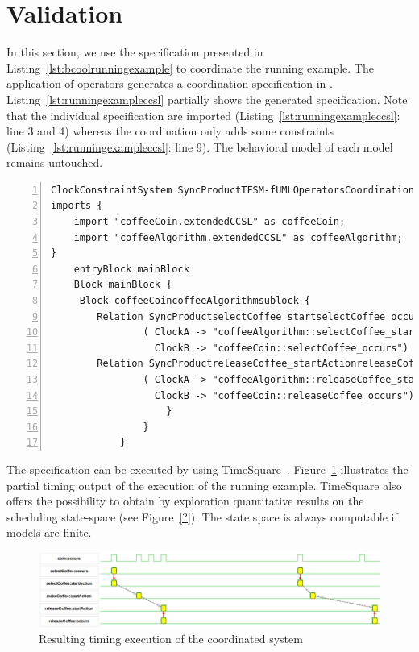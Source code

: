 \section{Validation}
\label{sec:validation}

In this section, we use the \bcool specification presented in Listing~\ref{lst:bcoolrunningexample} to coordinate the running example. The application of \bcool operators generates a coordination specification in \ccsl. Listing~\ref{lst:runningexampleccsl} partially shows the generated \ccsl specification. Note that the individual specification are imported (Listing~\ref{lst:runningexampleccsl}: line 3 and 4) whereas the coordination only adds some constraints (Listing~\ref{lst:runningexampleccsl}: line 9). The behavioral model of each model remains untouched. 
	
\begin{lstlisting}[language=moccml,
	caption={Resulting \ccsl specification for the running example},
	label={lst:runningexampleccsl}, 
	basicstyle=\scriptsize\ttfamily, backgroundcolor=\color{LGrey}, numbers=left, xleftmargin=2pt]
ClockConstraintSystem SyncProductTFSM-fUMLOperatorsCoordination {
imports {
	import "coffeeCoin.extendedCCSL" as coffeeCoin;
	import "coffeeAlgorithm.extendedCCSL" as coffeeAlgorithm;
}
	entryBlock mainBlock
	Block mainBlock {
	 Block coffeeCoincoffeeAlgorithmsublock {
		Relation SyncProductselectCoffee_startselectCoffee_occurs [ RendezVous ]
				( ClockA -> "coffeeAlgorithm::selectCoffee_startAction",
				  ClockB -> "coffeeCoin::selectCoffee_occurs")
		Relation SyncProductreleaseCoffee_startActionreleaseCoffee_occurs [ RendezVous ]
				( ClockA -> "coffeeAlgorithm::releaseCoffee_startAction",
				  ClockB -> "coffeeCoin::releaseCoffee_occurs")
					}
				}
			}
\end{lstlisting}    
		
The \ccsl specification can be executed by using TimeSquare~\cite{timesquarebib}. Figure~\ref{fig:coffemachinevcd} illustrates the partial timing output of the execution of the running example. TimeSquare also offers the possibility to obtain by exploration quantitative results on the scheduling state-space (see Figure~\ref{?}). The state space is always computable if models are finite. 
	 
\begin{figure}[h]
	 	\center
	  	\includegraphics[width=.9\textwidth]{bcool/figs/coffeemachinevcd}
	  	\caption{Resulting timing execution of the coordinated system}
	  	\label{fig:coffemachinevcd}
\end{figure}
	

